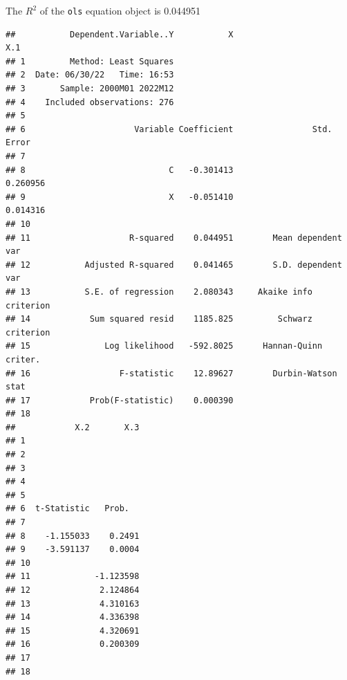 \documentclass[
]{article}
\newenvironment{Shaded}{\begin{snugshade}}{\end{snugshade}}
\newcommand{\NormalTok}[1]{#1}
\newcommand{\SpecialCharTok}[1]{\textcolor[rgb]{0.00,0.00,0.00}{#1}}
\begin{document}
The \(R^2\) of the \texttt{ols} equation object is 0.044951

\begin{Shaded}
\end{Shaded}

\begin{verbatim}
##           Dependent.Variable..Y           X                       X.1
## 1         Method: Least Squares                                      
## 2  Date: 06/30/22   Time: 16:53                                      
## 3       Sample: 2000M01 2022M12                                      
## 4    Included observations: 276                                      
## 5                                                                    
## 6                      Variable Coefficient                Std. Error
## 7                                                                    
## 8                             C   -0.301413                  0.260956
## 9                             X   -0.051410                  0.014316
## 10                                                                   
## 11                    R-squared    0.044951        Mean dependent var
## 12           Adjusted R-squared    0.041465        S.D. dependent var
## 13           S.E. of regression    2.080343     Akaike info criterion
## 14            Sum squared resid    1185.825         Schwarz criterion
## 15               Log likelihood   -592.8025      Hannan-Quinn criter.
## 16                  F-statistic    12.89627        Durbin-Watson stat
## 17            Prob(F-statistic)    0.000390                          
## 18                                                                   
##            X.2       X.3
## 1                       
## 2                       
## 3                       
## 4                       
## 5                       
## 6  t-Statistic   Prob.  
## 7                       
## 8    -1.155033    0.2491
## 9    -3.591137    0.0004
## 10                      
## 11             -1.123598
## 12              2.124864
## 13              4.310163
## 14              4.336398
## 15              4.320691
## 16              0.200309
## 17                      
## 18
\end{verbatim}

\begin{Shaded}
\end{Shaded}
\end{document}
